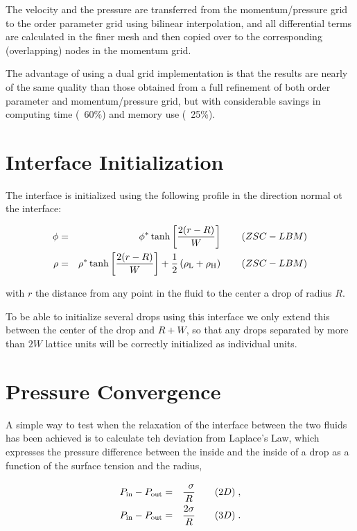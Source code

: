 \documentclass[12pt]{report}
\begin{document}
The velocity and the pressure are transferred from the momentum/pressure grid to the order parameter grid using bilinear interpolation, and all differential terms are calculated in the finer mesh and then copied over to the corresponding (overlapping) nodes in the momentum grid.

The advantage of using a dual grid implementation is that the results are nearly of the same quality than those obtained from a full refinement of both order parameter and momentum/pressure grid, but with considerable savings in computing time (~60\%) and memory use (~25\%).

\section{Interface Initialization}
The interface is initialized using the following profile in the direction normal ot the interface:

\begin{eqnarray}
\phi &=& \phi^*\tanh\left[\frac{2(r - R)}{W}\right] \quad\quad (ZSC-LBM)\\
\rho &=& \rho^*\tanh\left[\frac{2(r - R)}{W}\right] + \frac{1}{2}\left(\rho_{\rm L} + \rho_{\rm H}\right) \quad\quad (ZSC-LBM)
\end{eqnarray}

with $r$ the distance from any point in the fluid to the center a drop of radius $R$.

To be able to initialize several drops using this interface we only extend this between the center of the drop and $R+W$, so that any drops separated by more than $2W$ lattice units will be correctly initialized as individual units.

\section{Pressure Convergence}
A simple way to test when the relaxation of the interface between the two fluids has been achieved is to calculate teh deviation from Laplace's Law, which expresses the pressure difference between the inside and the inside of a drop as a function of the surface tension and the radius,

\begin{eqnarray}
P_{\rm in} - P_{\rm out} &=& \frac{\phantom{2}\sigma}{R} \quad\quad (2D)\;,\\
P_{\rm in} - P_{\rm out} &=& \frac{2\sigma}{R} \quad\quad (3D)\;.
\end{eqnarray}
\end{document}
